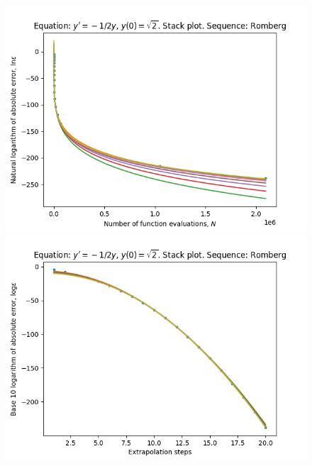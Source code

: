 \begin{figure}[H]
\centering
\begin{minipage}{0.45\textwidth}
\centering
\includegraphics[scale=0.45]{emr_plots/quad_sing_0_hp_romberg_stack.png}
\end{minipage}
\begin{minipage}{0.45\textwidth}
\centering
\includegraphics[scale=0.45]{emr_plots/quad_sing_0_hp_romberg_steps_stack.png}
\end{minipage}
\end{figure}

